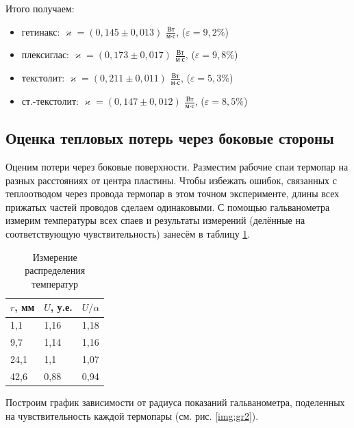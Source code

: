 \documentclass[a4paper,12pt]{article} %
\begin{document}
Итого получаем:

\begin{itemize}
	\item гетинакс: $ \varkappa = (0,145 \pm 0,013) $ $ \frac{\text{Вт}}{\text{м} \cdot \text{с}} $, ($\varepsilon = 9,2\%$)
	\item плексиглас: $ \varkappa = (0,173 \pm 0,017) $ $ \frac{\text{Вт}}{\text{м} \cdot \text{с}} $, ($\varepsilon = 9,8\%$)
	\item текстолит: $ \varkappa = (0,211 \pm 0,011) $ $ \frac{\text{Вт}}{\text{м} \cdot \text{с}} $, ($\varepsilon = 5,3\%$)
	\item ст.-текстолит: $ \varkappa = (0,147 \pm 0,012) $ $ \frac{\text{Вт}}{\text{м} \cdot \text{с}} $, ($\varepsilon = 8,5\%$)
\end{itemize}

\subsection{Оценка тепловых потерь через боковые стороны}

Оценим потери через боковые поверхности. Разместим рабочие спаи термопар на разных расстояниях от центра пластины. Чтобы избежать ошибок, связанных с теплоотводом через провода термопар в этом точном эксперименте, длины всех прижатых частей проводов сделаем одинаковыми. С помощью гальванометра измерим температуры всех спаев и результаты измерений (делённые на соответствующую чувствительность) занесём в таблицу \ref{tab:losses}.

\begin{table}[H]
	\centering
	\begin{tabular}{|l|l|l|}
		\hline
		$ r $, мм & $ U $, у.е. & $ U/\alpha $  \\ \hline
		1,1   & 1,16    & 1,18 \\ \hline
		9,7   & 1,14    & 1,16 \\ \hline
		24,1  & 1,1     & 1,07 \\ \hline
		42,6  & 0,88    & 0,94 \\ \hline
	\end{tabular}
	\caption{Измерение распределения температур}
	\label{tab:losses}
\end{table}

Построим график зависимости от радиуса показаний гальванометра, поделенных на чувствительность каждой термопары (см. рис. \ref{img:gr2}). 
\end{document}
